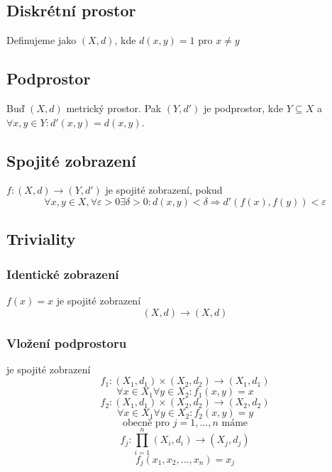 \documentclass[../main.tex]{subfiles}
\begin{document}
\subsection{Diskrétní prostor}
\hspace{1.2mm}
Definujeme jako $(X,d)$, kde $d(x,y) = 1$ pro $x \neq y$
\noindent

\subsection{Podprostor}
\hspace{1.2mm}
Buď $(X, d)$ metrický prostor. Pak $(Y, d')$ je podprostor, kde $Y \subseteq X$ a $\forall x,y \in Y : d'(x,y) = d(x,y)$.

\subsection{Spojité zobrazení}
\hspace{1.2mm}
$f \colon (X,d) \to (Y, d')$ je spojité zobrazení, pokud
\[ \forall x, y \in X, \forall \varepsilon > 0 \exists \delta > 0:
d(x,y) < \delta \Rightarrow d'(f(x), f(y)) < \varepsilon \]

\subsection{Triviality}
\subsubsection{Identické zobrazení}
$f(x) = x$ je spojité zobrazení
\hspace{1.2mm}
\[ (X,d) \to (X,d) \]

\subsubsection{Vložení podprostoru}
je spojité zobrazení 
\hspace{1.2mm}
\[ f_1\colon (X_1,d_1)\times(X_2,d_2) \rightarrow (X_1,d_1) \]
\[\forall x\in X_1 \forall y \in X_2 : f_1(x,y) = x\]
\[f_2 \colon (X_1,d_1)\times(X_2,d_2) \rightarrow (X_2,d_2)\]
\[\forall x\in X_1 \forall y \in X_2 : f_2(x,y) = y\]
\[\text{obecně pro } j=1,...,n \text{ máme}\]
\[f_j\colon\prod^n_{i=1}(X_i,d_i)\rightarrow(X_j,d_j)\]
\[f_j(x_1,x_2,...,x_n) = x_j\]
\end{document}
